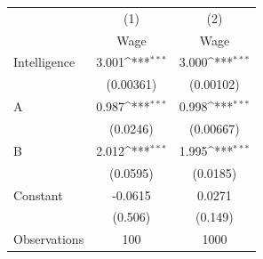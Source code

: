 {
\def\sym#1{\ifmmode^{#1}\else\(^{#1}\)\fi}
\begin{tabular}{l*{2}{c}}
\toprule
                    &\multicolumn{1}{c}{(1)}&\multicolumn{1}{c}{(2)}\\
                    &\multicolumn{1}{c}{Wage}&\multicolumn{1}{c}{Wage}\\
\midrule
Intelligence        &       3.001\sym{***}&       3.000\sym{***}\\
                    &   (0.00361)         &   (0.00102)         \\
\addlinespace
A                   &       0.987\sym{***}&       0.998\sym{***}\\
                    &    (0.0246)         &   (0.00667)         \\
\addlinespace
B                   &       2.012\sym{***}&       1.995\sym{***}\\
                    &    (0.0595)         &    (0.0185)         \\
\addlinespace
Constant            &     -0.0615         &      0.0271         \\
                    &     (0.506)         &     (0.149)         \\
\midrule
Observations        &         100         &        1000         \\
\bottomrule
\end{tabular}
}
